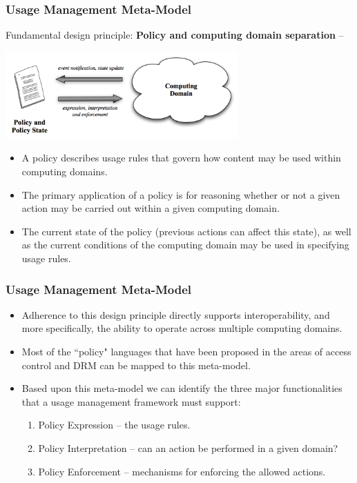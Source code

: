 \documentclass[t,handout, 10pt]{beamer}
\begin{document}
\begin{frame}
\frametitle{Usage Management Meta-Model}
{\small
Fundamental design principle: \textbf{Policy and computing domain separation} --
 \centerline{\includegraphics[width=3.5in]{meta-model.png}}
 \begin{itemize}
 \item A policy describes usage rules that govern how content may be used within computing domains.
 \pause
 \item The primary application of a policy is for reasoning whether or not a given action may be carried out within a given computing domain.
 \pause
 \item The current state of the policy (previous actions can affect this state), as well as the current conditions of the computing domain may be used in specifying usage rules.
 \end{itemize}}
\end{frame}

\begin{frame}\frametitle{Usage Management Meta-Model}
 \begin{itemize}
 \item Adherence to this design principle directly supports interoperability, and more specifically, the ability to operate across multiple computing domains.
 \pause
 \item Most of the ``policy" languages that have been proposed in the areas of access control and DRM can be mapped to this meta-model.
  \pause
 \item Based upon this meta-model we can identify the three major functionalities that a usage management framework must support: 
 \begin{enumerate}
  \item Policy Expression -- the usage rules.
  \item Policy Interpretation -- can an action be performed in a given domain?
  \item Policy Enforcement -- mechanisms for enforcing the allowed actions.
  \end{enumerate}
 \end{itemize}
\end{frame}
\end{document}

